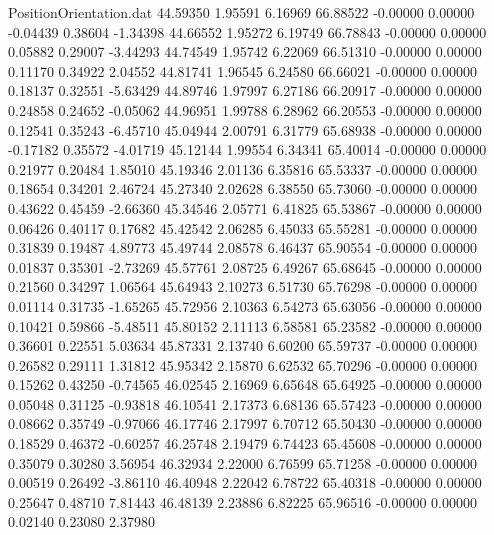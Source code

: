 \begin{filecontents}{PositionOrientation.dat}
  44.59350    1.95591    6.16969    66.88522   -0.00000    0.00000   -0.04439    0.38604   -1.34398
  44.66552    1.95272    6.19749    66.78843   -0.00000    0.00000    0.05882    0.29007   -3.44293
  44.74549    1.95742    6.22069    66.51310   -0.00000    0.00000    0.11170    0.34922    2.04552
  44.81741    1.96545    6.24580    66.66021   -0.00000    0.00000    0.18137    0.32551   -5.63429
  44.89746    1.97997    6.27186    66.20917   -0.00000    0.00000    0.24858    0.24652   -0.05062
  44.96951    1.99788    6.28962    66.20553   -0.00000    0.00000    0.12541    0.35243   -6.45710
  45.04944    2.00791    6.31779    65.68938   -0.00000    0.00000   -0.17182    0.35572   -4.01719
  45.12144    1.99554    6.34341    65.40014   -0.00000    0.00000    0.21977    0.20484    1.85010
  45.19346    2.01136    6.35816    65.53337   -0.00000    0.00000    0.18654    0.34201    2.46724
  45.27340    2.02628    6.38550    65.73060   -0.00000    0.00000    0.43622    0.45459   -2.66360
  45.34546    2.05771    6.41825    65.53867   -0.00000    0.00000    0.06426    0.40117    0.17682
  45.42542    2.06285    6.45033    65.55281   -0.00000    0.00000    0.31839    0.19487    4.89773
  45.49744    2.08578    6.46437    65.90554   -0.00000    0.00000    0.01837    0.35301   -2.73269
  45.57761    2.08725    6.49267    65.68645   -0.00000    0.00000    0.21560    0.34297    1.06564
  45.64943    2.10273    6.51730    65.76298   -0.00000    0.00000    0.01114    0.31735   -1.65265
  45.72956    2.10363    6.54273    65.63056   -0.00000    0.00000    0.10421    0.59866   -5.48511
  45.80152    2.11113    6.58581    65.23582   -0.00000    0.00000    0.36601    0.22551    5.03634
  45.87331    2.13740    6.60200    65.59737   -0.00000    0.00000    0.26582    0.29111    1.31812
  45.95342    2.15870    6.62532    65.70296   -0.00000    0.00000    0.15262    0.43250   -0.74565
  46.02545    2.16969    6.65648    65.64925   -0.00000    0.00000    0.05048    0.31125   -0.93818
  46.10541    2.17373    6.68136    65.57423   -0.00000    0.00000    0.08662    0.35749   -0.97066
  46.17746    2.17997    6.70712    65.50430   -0.00000    0.00000    0.18529    0.46372   -0.60257
  46.25748    2.19479    6.74423    65.45608   -0.00000    0.00000    0.35079    0.30280    3.56954
  46.32934    2.22000    6.76599    65.71258   -0.00000    0.00000    0.00519    0.26492   -3.86110
  46.40948    2.22042    6.78722    65.40318   -0.00000    0.00000    0.25647    0.48710    7.81443
  46.48139    2.23886    6.82225    65.96516   -0.00000    0.00000    0.02140    0.23080    2.37980

\end{filecontents}
